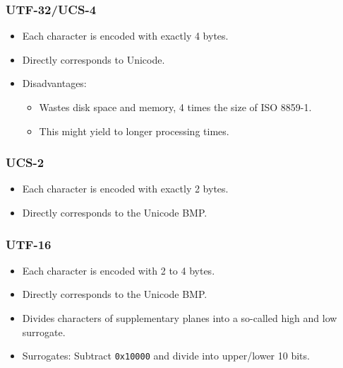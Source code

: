 \documentclass[a4paper, 11pt, accentcolor = tud3b]{tudreport}
\begin{document}
                \subsubsection{UTF-32/UCS-4} %
                    \begin{itemize}
                    	\item Each character is encoded with exactly 4 bytes.
                    	\item Directly corresponds to Unicode.
                    	\item Disadvantages:
                    		\begin{itemize}
                    			\item Wastes disk space and memory, 4 times the size of ISO 8859-1.
                    			\item This might yield to longer processing times.
                    		\end{itemize}
                    \end{itemize}

                \subsubsection{UCS-2} %
                    \begin{itemize}
                    	\item Each character is encoded with exactly 2 bytes.
                    	\item Directly corresponds to the Unicode BMP.
                    \end{itemize}

                \subsubsection{UTF-16} %
                    \begin{itemize}
                    	\item Each character is encoded with 2 to 4 bytes.
                    	\item Directly corresponds to the Unicode BMP.
                    	\item Divides characters of supplementary planes into a so-called high and low surrogate.
                    	\item Surrogates: Subtract \texttt{0x10000} and divide into upper/lower 10 bits.
                    \end{itemize}
\end{document}
